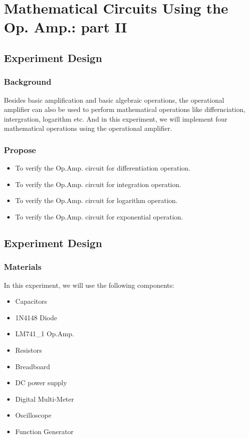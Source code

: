 \section{Mathematical Circuits Using the Op. Amp.: part II}

\subsection{Experiment Design}
    \subsubsection{Background}
    Besides basic amplification and basic algebraic operations, the operational amplifier can also be used to perform mathematical operations like differnciation, intergration, logarithm etc. And in this experiment, we will implement four mathematical operations using the operational amplifier.

    \subsubsection{Propose}
    \begin{itemize}
        \item To verify the Op.Amp. circuit for differentiation operation.
        \item To verify the Op.Amp. circuit for integration operation.
        \item To verify the Op.Amp. circuit for logarithm operation.
        \item To verify the Op.Amp. circuit for exponential operation.
    \end{itemize}

\subsection{Experiment Design}
    \subsubsection{Materials}
        In this experiment, we will use the following components:
        \begin{itemize}
            \item Capacitors
            \item 1N4148 Diode
            \item LM741\_1 Op.Amp.
            \item Resistors
            \item Breadboard
            \item DC power supply
            \item Digital Multi-Meter
            \item Oscilloscope
            \item Function Generator
        \end{itemize}

